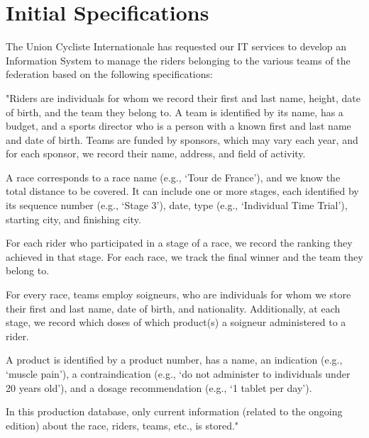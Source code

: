 \section{Initial Specifications}

The Union Cycliste Internationale has requested our IT services to develop an Information System to manage the riders belonging to the various teams of the federation based on the following specifications:

"Riders are individuals for whom we record their first and last name, height, date of birth, and the team they belong to. A team is identified by its name, has a budget, and a sports director who is a person with a known first and last name and date of birth. Teams are funded by sponsors, which may vary each year, and for each sponsor, we record their name, address, and field of activity. 

A race corresponds to a race name (e.g., ‘Tour de France’), and we know the total distance to be covered. It can include one or more stages, each identified by its sequence number (e.g., ‘Stage 3’), date, type (e.g., ‘Individual Time Trial’), starting city, and finishing city. 

For each rider who participated in a stage of a race, we record the ranking they achieved in that stage. For each race, we track the final winner and the team they belong to. 

For every race, teams employ soigneurs, who are individuals for whom we store their first and last name, date of birth, and nationality. Additionally, at each stage, we record which doses of which product(s) a soigneur administered to a rider. 

A product is identified by a product number, has a name, an indication (e.g., ‘muscle pain’), a contraindication (e.g., ‘do not administer to individuals under 20 years old’), and a dosage recommendation (e.g., ‘1 tablet per day’). 

In this production database, only current information (related to the ongoing edition) about the race, riders, teams, etc., is stored."
